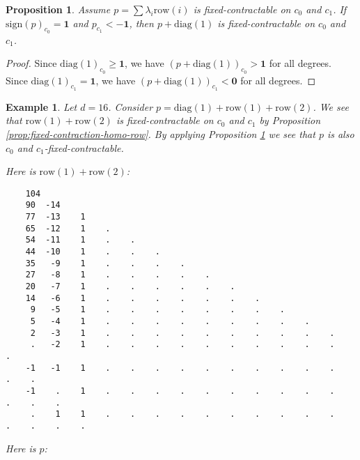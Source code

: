 \documentclass[11pt]{article}
\newtheorem{proposition}[theorem]{Proposition}
\newtheorem{example}[theorem]{Example}
\begin{document}
\begin{proposition}\label{props:fixed-contractable-unirow-ui23}
  Assume \( p = \sum \lambda_i \mathrm{row}(i) \) is fixed-contractable on \( c_0 \) and \( c_1 \). If \( \mathrm{sign}(p)_{c_0} = \mathbf 1 \) and \(p_{c_1} < \mathbf{-1} \), then \( p + \mathrm{diag}(1) \) is fixed-contractable on \( c_0 \) and \( c_1 \).
\end{proposition}

\begin{proof}
  Since \( \mathrm{diag}(1)_{c_0} \geq \mathbf 1 \), we have \( (p + \mathrm{diag}(1))_{c_0} > \mathbf{1} \) for all degrees. 
  Since \( \mathrm{diag}(1)_{c_1} = \mathbf 1 \), we have \( (p + \mathrm{diag}(1))_{c_1} < \mathbf{0} \) for all degrees. 
\end{proof}

\begin{example}
  Let \( d = 16 \).
  Consider \( p = \mathrm{diag}(1) + \mathrm{row}(1) + \mathrm{row}(2)  \). We see that \( \mathrm{row}(1) + \mathrm{row}(2) \) is fixed-contractable on \( c_0 \) and \( c_1 \) by Proposition \ref{prop:fixed-contraction-homo-row}. By applying Proposition \ref{props:fixed-contractable-unirow-ui23} we see that \( p \) is also \( c_0 \) and \( c_1 \)-fixed-contractable.

  Here is \( \mathrm{row}(1) + \mathrm{row}(2) \):
  \begingroup
  \fontsize{8pt}{10pt}\selectfont
  \begin{verbatim}
    104 
    90  -14 
    77  -13    1 
    65  -12    1    . 
    54  -11    1    .    . 
    44  -10    1    .    .    . 
    35   -9    1    .    .    .    . 
    27   -8    1    .    .    .    .    . 
    20   -7    1    .    .    .    .    .    . 
    14   -6    1    .    .    .    .    .    .    . 
     9   -5    1    .    .    .    .    .    .    .    . 
     5   -4    1    .    .    .    .    .    .    .    .    . 
     2   -3    1    .    .    .    .    .    .    .    .    .    . 
     .   -2    1    .    .    .    .    .    .    .    .    .    .    . 
    -1   -1    1    .    .    .    .    .    .    .    .    .    .    .    . 
    -1    .    1    .    .    .    .    .    .    .    .    .    .    .    .    . 
     .    1    1    .    .    .    .    .    .    .    .    .    .    .    .    .    .   
  \end{verbatim}
  \endgroup

  Here is \( p \):
  

\end{example}
\end{document}

